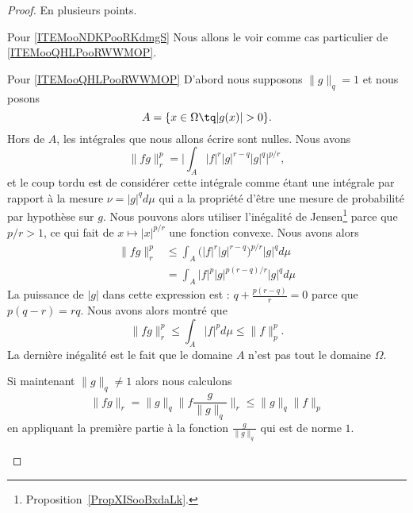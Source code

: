 \begin{proof}
    En plusieurs points.
    \begin{subproof}
    \item[Pour \ref{ITEMooNDKPooRKdmgS}]
        Nous allons le voir comme cas particulier de \ref{ITEMooQHLPooRWWMOP}.
    \item[Pour \ref{ITEMooQHLPooRWWMOP}]
        D'abord nous supposons \( \| g \|_q=1\) et nous posons
    \begin{equation}
        A=\{ x\in\Omega\tq | g(x) |>0 \}.
    \end{equation}
    Hors de \( A\), les intégrales que nous allons écrire sont nulles. Nous avons
    \begin{equation}
        \| fg \|_r^p=\Big|  \int_A| f |^r| g |^{r-q}| g |^q  \Big|^{p/r},
    \end{equation}
    et le coup tordu est de considérer cette intégrale comme étant une intégrale par rapport à la mesure \( \nu=| g |^qd\mu\) qui a la propriété d'être une mesure de probabilité par hypothèse sur \( g\). Nous pouvons alors utiliser l'inégalité de Jensen\footnote{Proposition~\ref{PropXISooBxdaLk}.} parce que \( p/r>1\), ce qui fait de \( x\mapsto | x |^{p/r}\) une fonction convexe. Nous avons alors
    \begin{subequations}
        \begin{align}
            \| fg \|_r^p&\leq\int_A\big( | f |^r| g |^{r-q} \big)^{p/r}| g |^qd\mu\\
            &=\int_A| f |^{p}| g |^{p(r-q)/r}| g |^qd\mu
        \end{align}
    \end{subequations}
    La puissance de \( | g |\) dans cette expression est : \( q+\frac{ p(r-q) }{ r }=0\) parce que \( p(q-r)=rq\). Nous avons alors montré que
    \begin{equation}
        \| fg \|_r^p\leq \int_A| f |^pd\mu\leq \| f \|_p^p.
    \end{equation}
    La dernière inégalité est le fait que le domaine \( A\) n'est pas tout le domaine \( \Omega\).

    Si maintenant \( \| g \|_q\neq 1\) alors nous calculons
    \begin{equation}
        \| fg \|_r=\| g \|_q\| f\frac{ g }{ \| g \|_q } \|_r\leq \| g \|_q\| f \|_p
    \end{equation}
    en appliquant la première partie à la fonction \( \frac{ g }{ \| g \|_q }\) qui est de norme \( 1\).


\end{subproof}
\end{proof}
